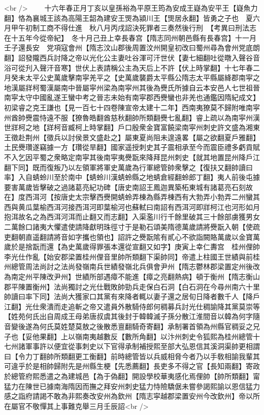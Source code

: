 <br />
　　十六年春正月丁亥以皇孫裕為平原王筠為安成王嶷為安平王【嶷魚力翻】恪為襄城王該為高陽王韶為建安王煚為潁川王【煚居永翻】皆勇之子也　夏六月甲午初制工商不得仕進　秋八月丙戌詔決死罪者三奏然後行刑　【考異曰刑法志在十五年今從帝紀】　冬十月己丑上幸長春宫【隋志同州朝邑縣有長春宫】十一月壬子還長安　党項寇會州【隋志汶山郡後周置汶州開皇初改曰蜀州尋為會州党底朗翻】詔發隴西兵討降之帝以光化公主妻吐谷渾可汗世伏【妻七細翻吐從暾入聲谷音浴可從刋入聲汗音寒】世伏上表請稱公主為天后上不許【伏上時掌翻】十七年春二月癸未太平公史萬歲擊南寜羌平之【史萬歲襲爵太平縣公隋志太平縣屬絳郡南寜之地漢屬牂柯蜀漢屬南中晉屬寜州梁為南寜州其後為㸑氏所據自云本安邑人七世祖晉南寜太守中國亂遂王蠻中考之晉志未始有南寜郡西㸑蠻也非羌也通鑑因隋紀成文】初梁睿之克王謙也【見一百七十四卷陳宣帝太建十二年】西南夷獠莫不歸附唯南寜州酋帥㸑震恃遠不服【獠魯皓翻酋慈秋翻帥所類翻㸑七亂翻】睿上疏以為南寜州漢世牂柯之地【牂柯音臧柯上時掌翻】戶口殷衆金寶富饒梁南寜州刺史許文盛為湘東王徵赴荆州【徵兵以討侯景文盛赴之】屬東夏尚阻未遑遠畧【屬之欲翻夏戶雅翻】土民㸑瓚遂竊據一方【瓚從旱翻】國家遥授刺史其子震相承至今而震臣禮多虧貢賦不入乞因平蜀之衆略定南寜其後南寜夷㸑翫來降拜昆州刺史【就其地置昆州降戶江翻下同】既而復叛乃以左領軍將軍史萬歲為行軍總管帥衆擊之【復扶又翻帥讀曰率】入自蜻蛉川至於南中【蜻蛉川漢蜻蛉縣之地蜻倉經翻蛉郎丁翻】夷人前後屯據要害萬歲皆擊破之過諸葛亮紀功碑【唐史南詔王鳳迦異築柘東城有諸葛亮石刻故在】度西洱河【按唐史太宗擊西㸑開蜻蛉弄棟為縣弄棟西有大勃弄小勃弄二州蠻其西與黄瓜葉榆西洱河接西洱河即葉榆河也蘇軾曰南詔有西洱河即牂柯江也河形如月抱洱故名之為西洱河洱而止翻又而志翻】入渠濫川行千餘里破其三十餘部虜獲男女二萬餘口諸夷大懼遣使請降獻明珠徑寸于是勒石頌美隋德萬歲請將㸑翫入朝【使疏吏翻朝直遥翻請將音如字攜也領也】詔許之㸑翫隂有貳心不欲詣闕賂萬歲以金寶萬歲於是捨翫而還【為史萬歲得罪張本還從宣翻又如字】庚寅上幸仁夀宫　桂州俚帥李光仕作亂【始安郡梁置桂州俚音里帥所類翻下渠帥同】帝遣上柱國王世績與前桂州總管周法尚討之法尚發嶺南兵世績發嶺北兵俱會尹州【隋志鬱林郡梁置定州後改為南定州平陳改尹州】世績所部遇瘴不能進【瘴之亮翻熱病】頓于衡州【隋志衡山郡平陳置衡州】法尚獨討之光仕戰敗帥勁兵走保白石洞【白石洞在今尋州南六十里帥讀曰率下同】法尚大獲家口其黨有來降者輒以妻子還之居旬日降者數千人【降戶江翻】光仕衆潰而走追斬之帝又遣員外散騎侍郎何稠募兵討光仕稠諭降其黨莫崇等【姓苑何氏出自周成王母弟唐叔虞其後封于韓韓滅子孫分散江淮間音以韓為何字隨音變後遂為何氏莫姓楚莫敖之後散悉亶翻騎奇寄翻】承制署首領為州縣官稠妥之兄子也【妥他果翻】上以嶺南夷越數反【數所角翻】以汴州刺史令狐熙為桂州總管十七州諸軍事許以便宜從事刺史以下官得承制補授熙至部大弘恩信其溪洞渠帥更相謂曰【令力丁翻帥所類翻更工衡翻】前時總管皆以兵威相脅今者乃以手敎相諭我輩其可違乎於是相帥歸附先是州縣生梗【先悉薦翻】長吏多不得之官【長知兩翻】寄政於總管府熙悉遣之為建城邑【為于偽翻】開設學校華夷感化焉俚帥【帥所類翻】甯猛力在陳世已據南海隋因而撫之拜安州刺史猛力恃險驕倨未嘗參謁熙諭以恩信猛力感之詣府請謁不敢為非熙奏改安州為欽州【隋志寜越郡梁置安州今改欽州】帝以所在屬官不敬憚其上事難克舉三月壬辰詔<br />
